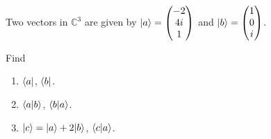 \begin{exercise}
 Two vectors in $\mathbb{C}^{3}$ are given by $\vert a\rangle=\begin{pmatrix}
-2\\
4i\\
1
\end{pmatrix}$ and $\vert b\rangle=\begin{pmatrix}
1\\
0\\
i
\end{pmatrix}$.

Find
\begin{enumerate}
 \item $\langle a\vert$, $\langle b\vert$.
 \item $\langle a\vert b\rangle$, $\langle b\vert a\rangle$.
 \item $\vert c\rangle=\vert a\rangle+2\vert b\rangle$, $\langle c\vert a\rangle$.
\end{enumerate}
\end{exercise}

